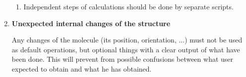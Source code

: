 \begin{enumerate}
\begin{enumerate}
            \item Independent steps of calculations should be done by separate scripts.

            
        \end{enumerate}


    \item \textbf{Unexpected internal changes of the structure}

    Any changes of the molecule (its position, orientation, ...) must not be
    used as default operations, but optional things with a clear output of what
    have been done. This will prevent from possible confusions between what user
    expected to obtain and what he has obtained. 


\end{enumerate}
